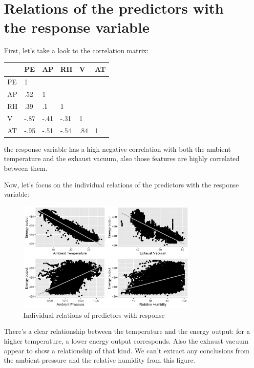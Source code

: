 \section{Relations of the predictors with the response variable}
First, let's take a look to the correlation matrix:
\begin{center}
    \begin{tabular}{ |p{.75cm}|p{.75cm}|p{.75cm}|p{.75cm}|p{.75cm}|p{.75cm}|}
     \hline
      & PE & AP & RH & V & AT \\
     \hline
     PE & 1 &  &  &  & \\
     \hline
     AP & .52 & 1 &  &  & \\
     \hline
     RH & .39 & .1 & 1 &  & \\
     \hline
     V & -.87 & -.41 & -.31 & 1 & \\
     \hline
     AT & -.95 & -.51 & -.54 & .84 & 1\\
     \hline
    \end{tabular}
\end{center}
the response variable has a high negative correlation with both the ambient temperature and the exhaust vacuum, also those features are highly correlated between them.

Now, let's focus on the individual relations of the predictors with the response variable:
\begin{figure}[H]
    \begin{center}
        \includegraphics[width=0.8\textwidth]{img/relations.jpg}
        \caption{Individual relations of predictors with response}
    \end{center}
\end{figure}
There's a clear relationship between the temperature and the energy output: for a higher temperature, a lower energy output corresponds. Also the exhaust vacuum appear to show a relationship of that kind. We can't extract any conclusions from the ambient pressure and the relative humidity from this figure.

